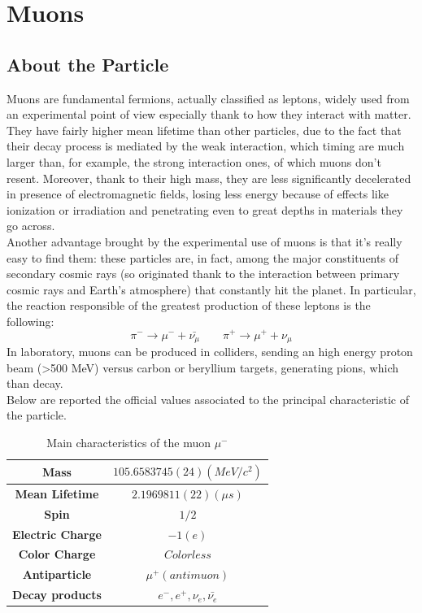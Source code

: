 \documentclass[a4paper,11pt]{book}
\begin{document}
\chapter{Muons}

\section{About the Particle}
Muons are fundamental fermions, actually classified as leptons, widely used from an experimental point of view especially thank to how they interact with matter. They have fairly higher mean lifetime than other particles, due to the fact that their decay process is mediated by the weak interaction, which timing are much larger than, for example, the strong interaction ones, of which muons don't resent. Moreover, thank to their high mass, they are less significantly decelerated in presence of electromagnetic fields, losing less energy because of effects like ionization or irradiation and penetrating even to great depths in materials they go across.\\
Another advantage brought by the experimental use of muons is that it's really easy to find them: these particles are, in fact, among the major constituents of secondary cosmic rays (so originated thank to the interaction between primary cosmic rays and Earth's atmosphere) that constantly hit the planet. In particular, the reaction responsible of the greatest production of these leptons is the following:
\[ \pi^- \to \mu^- + \bar{\nu_\mu} \qquad \pi^+ \to \mu^+ + \nu_\mu \]
In laboratory, muons can be produced in colliders, sending an high energy proton beam (\textgreater 500 MeV) versus carbon or beryllium targets, generating pions, which than decay. \\

Below are reported the official values associated to the principal characteristic of the particle.
\begin{table}[htbp]
\centering
\begin{tabular}{c c}
\toprule
\textbf{Mass} & $105.6583745(24) (MeV/c^2)$\\
\midrule
\textbf{Mean Lifetime} & $2.1969811(22) (\mu s)$\\
\midrule
\textbf{Spin} & $1/2$\\
\midrule
\textbf{Electric Charge} & $-1 (e)$\\
\midrule
\textbf{Color Charge} & $Colorless$\\
\midrule
\textbf{Antiparticle} & $\mu^+ (antimuon)$\\
\midrule
\textbf{Decay products} & $e^-,e^+,\nu_e,\bar{\nu_e}$\\
\bottomrule
\end{tabular}
\caption{Main characteristics of the muon $\mu^-$}
\label{tab:muon_parameters}
\end{table}
\end{document}
